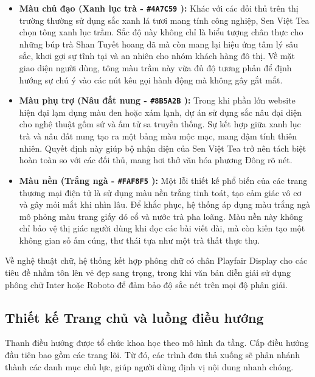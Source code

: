 \begin{itemize}
	\item \textbf{Màu chủ đạo (Xanh lục trà - \texttt{\#4A7C59} \fboxsep=0pt):} Khác với các đối thủ trên thị trường thường sử dụng sắc xanh lá tươi mang tính công nghiệp, Sen Việt Tea chọn tông xanh lục trầm. Sắc độ này không chỉ là biểu tượng chân thực cho những búp trà Shan Tuyết hoang dã mà còn mang lại hiệu ứng tâm lý sâu sắc, khơi gợi sự tĩnh tại và an nhiên cho nhóm khách hàng đô thị. Về mặt giao diện người dùng, tông màu trầm này vừa đủ độ tương phản để định hướng sự chú ý vào các nút kêu gọi hành động mà không gây gắt mắt.
	\item \textbf{Màu phụ trợ (Nâu đất nung - \texttt{\#8B5A2B} \fboxsep=0pt):} Trong khi phần lớn website hiện đại lạm dụng màu đen hoặc xám lạnh, dự án sử dụng sắc nâu đại diện cho nghệ thuật gốm sứ và ấm tử sa truyền thống. Sự kết hợp giữa xanh lục trà và nâu đất nung tạo ra một bảng màu mộc mạc, mang đậm tính thiên nhiên. Quyết định này giúp bộ nhận diện của Sen Việt Tea trở nên tách biệt hoàn toàn so với các đối thủ, mang hơi thở văn hóa phương Đông rõ nét.
	\item \textbf{Màu nền (Trắng ngà - \texttt{\#FAF8F5} \fboxsep=0pt):} Một lỗi thiết kế phổ biến của các trang thương mại điện tử là sử dụng màu nền trắng tinh toát, tạo cảm giác vô cơ và gây mỏi mắt khi nhìn lâu. Để khắc phục, hệ thống áp dụng màu trắng ngà mô phỏng màu trang giấy dó cổ và nước trà pha loãng. Màu nền này không chỉ bảo vệ thị giác người dùng khi đọc các bài viết dài, mà còn kiến tạo một không gian số ấm cúng, thư thái tựa như một trà thất thực thụ.
\end{itemize}

Về nghệ thuật chữ, hệ thống kết hợp phông chữ có chân Playfair Display cho các tiêu đề nhằm tôn lên vẻ đẹp sang trọng, trong khi văn bản diễn giải sử dụng phông chữ Inter hoặc Roboto để đảm bảo độ sắc nét trên mọi độ phân giải.

\subsection{Thiết kế Trang chủ và luồng điều hướng}
Thanh điều hướng được tổ chức khoa học theo mô hình đa tầng. Cấp điều hướng đầu tiên bao gồm các trang lõi. Từ đó, các trình đơn thả xuống sẽ phân nhánh thành các danh mục chủ lực, giúp người dùng định vị nội dung nhanh chóng.

